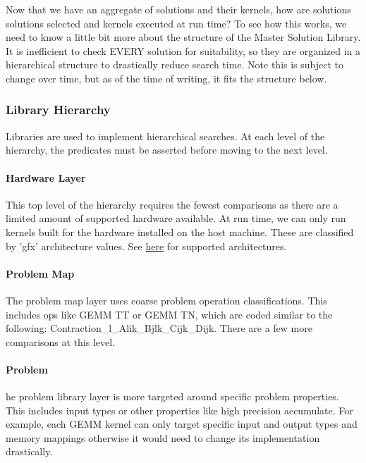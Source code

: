 \documentclass[]{article}
\begin{document}
Now that we have an aggregate of solutions and their kernels, how are solutions solutions selected and kernels executed at run time? To see how this works, we need to know a little bit more about the structure of the Master Solution Library. It is inefficient to check EVERY solution for suitability, so they are organized in a hierarchical structure to drastically reduce search time. Note this is subject to change over time, but as of the time of writing, it fits the structure below.

\subsubsection{Library Hierarchy}

Libraries are used to implement hierarchical searches. At each level of the hierarchy, the predicates must be asserted before moving to the next level. 

\paragraph{Hardware Layer}

This top level of the hierarchy requires the fewest comparisons as there are a limited amount of supported hardware available. At run time, we can only run kernels built for the hardware installed on the host machine. These are classified by 'gfx' architecture values. See \href{https://github.com/ROCmSoftwarePlatform/Tensile/wiki/Languages}{here} for supported architectures.

\paragraph{Problem Map}
The problem map layer uses coarse problem operation classifications. This includes ops like GEMM TT or GEMM TN, which are coded similar to the following: Contraction\_l\_Alik\_Bjlk\_Cijk\_Dijk. There are a few more comparisons at this level.

\paragraph{Problem}

he problem library layer is more targeted around specific problem properties. This includes input types or other properties like high precision accumulate. For example, each GEMM kernel can only target specific input and output types and memory mappings otherwise it would need to change its implementation drastically.
\end{document}
